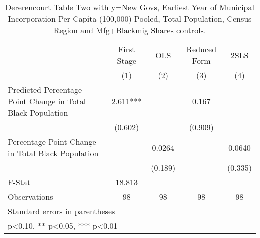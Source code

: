 \begin{table}[htbp]\centering
\def\sym#1{\ifmmode^{#1}\else\(^{#1}\)\fi}
\caption{Dererencourt Table Two with y=New Govs, Earliest Year of Municipal Incorporation Per Capita (100,000) Pooled, Total Population, Census Region and Mfg+Blackmig Shares controls.}
\begin{tabular}{l*{4}{c}}
\toprule
                    & First Stage   &         OLS   &Reduced Form   &        2SLS   \\
                    &\multicolumn{1}{c}{(1)}   &\multicolumn{1}{c}{(2)}   &\multicolumn{1}{c}{(3)}   &\multicolumn{1}{c}{(4)}   \\
\midrule
Predicted Percentage Point Change in Total Black Population&       2.611***&               &       0.167   &               \\
                    &     (0.602)   &               &     (0.909)   &               \\
\addlinespace
Percentage Point Change in Total Black Population&               &      0.0264   &               &      0.0640   \\
                    &               &     (0.189)   &               &     (0.335)   \\
\midrule
F-Stat              &      18.813   &               &               &               \\
Observations        &          98   &          98   &          98   &          98   \\
\bottomrule
\multicolumn{5}{l}{\footnotesize Standard errors in parentheses}\\
\multicolumn{5}{l}{\footnotesize * p<0.10, ** p<0.05, *** p<0.01}\\
\end{tabular}
\end{table}
